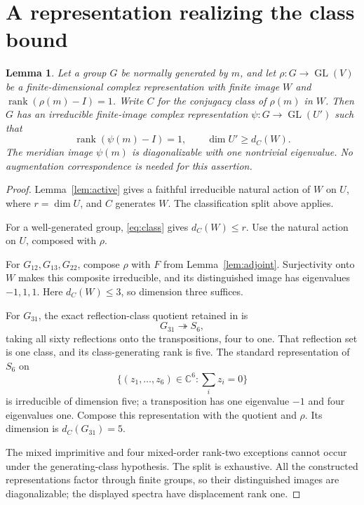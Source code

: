 \documentclass[11pt]{article}
\newtheorem{lemma}[theorem]{Lemma}
\newcommand{\C}{\mathbb C}
\newcommand{\GL}{\operatorname{GL}}
\newcommand{\rank}{\operatorname{rank}}
\begin{document}
\section{A representation realizing the class bound}

\begin{lemma}\label{lem:capacity}
Let a group $G$ be normally generated by $m$, and let
$\rho:G\to\GL(V)$ be a finite-dimensional complex representation
with finite image $W$ and $\rank(\rho(m)-I)=1$.
Write $C$ for the conjugacy class of $\rho(m)$ in $W$.
Then $G$ has an irreducible finite-image complex representation
$\psi:G\to\GL(U')$ such that
\[
 \rank(\psi(m)-I)=1,\qquad \dim U'\ge d_C(W).
\]
The meridian image $\psi(m)$ is diagonalizable with one nontrivial
eigenvalue. No augmentation correspondence is needed for this assertion.
\end{lemma}
\begin{proof}
Lemma~\ref{lem:active} gives a faithful irreducible natural action of
$W$ on $U$, where $r=\dim U$, and $C$ generates $W$.
The classification split above applies.

For a well-generated group, \eqref{eq:class} gives $d_C(W)\le r$.
Use the natural action on $U$, composed with $\rho$.

For $G_{12},G_{13},G_{22}$, compose $\rho$ with $F$ from
Lemma~\ref{lem:adjoint}. Surjectivity onto $W$ makes this composite
irreducible, and its distinguished image has eigenvalues $-1,1,1$.
Here $d_C(W)\le3$, so dimension three suffices.

For $G_{31}$, the exact reflection-class quotient retained in
\cite[quotient theorem and class-rank corollary]{g31} is
\[
                       G_{31}\twoheadrightarrow S_6,
\]
taking all sixty reflections onto the transpositions, four to one.
That reflection set is one class, and its class-generating rank is
five. The standard representation of $S_6$ on
\[
                 \{(z_1,\ldots,z_6)\in\C^6:\sum_i z_i=0\}
\]
is irreducible of dimension five; a transposition has one eigenvalue
$-1$ and four eigenvalues one. Compose this representation with the
quotient and $\rho$. Its dimension is $d_C(G_{31})=5$.

The mixed imprimitive and four mixed-order rank-two exceptions
cannot occur under the generating-class hypothesis.
The split is exhaustive. All the constructed representations
factor through finite groups, so their distinguished images are
diagonalizable; the displayed spectra have displacement rank one.
\end{proof}
\end{document}
